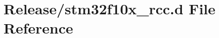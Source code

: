 \hypertarget{stm32f10x__rcc_8d}{}\section{Release/stm32f10x\+\_\+rcc.d File Reference}
\label{stm32f10x__rcc_8d}
